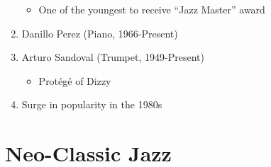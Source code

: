 \documentclass[]{article}
\providecommand{\tightlist}{%
  \setlength{\itemsep}{0pt}\setlength{\parskip}{0pt}}
\begin{document}
\begin{enumerate}
  \begin{itemize}
  \tightlist
  \item
    One of the youngest to receive ``Jazz Master'' award
  \end{itemize}
\item
  Danillo Perez (Piano, 1966-Present)
\item
  Arturo Sandoval (Trumpet, 1949-Present)

  \begin{itemize}
  \tightlist
  \item
    Protégé of Dizzy
  \end{itemize}
\item
  Surge in popularity in the 1980s
\end{enumerate}

\section{Neo-Classic Jazz}\label{neo-classic-jazz}
\end{document}

